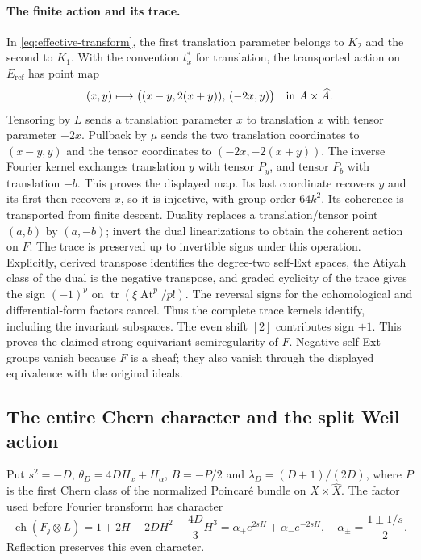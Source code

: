 \documentclass[11pt]{article}
\theoremstyle{definition}
\theoremstyle{remark}
\begin{document}
\paragraph{The finite action and its trace.}
In \eqref{eq:effective-transform}, the first translation parameter belongs to $K_2$ and
the second to $K_1$. With the convention $t_x^*$ for translation,
the transported action on $E_{\mathrm{ref}}$ has point map
\begin{equation}\label{eq:effective-action}
 (x,y)\longmapsto
 \bigl((x-y,2(x+y)),\,(-2x,y)\bigr)
 \quad\hbox{in }A\times\widehat A.                       
\end{equation}
Tensoring by $L$ sends a translation parameter $x$ to translation $x$ with tensor parameter $-2x$. Pullback by $\mu$ sends the two translation coordinates to $(x-y,y)$ and the tensor coordinates to $(-2x,-2(x+y))$. The inverse Fourier kernel exchanges translation $y$ with tensor $P_y$, and tensor $P_b$ with translation $-b$. This proves the displayed map. Its last coordinate recovers $y$ and its first then recovers $x$, so it is injective, with group order $64k^2$. Its coherence is transported from finite descent. Duality replaces a translation/tensor
point $(a,b)$ by $(a,-b)$; invert the dual linearizations to obtain
the coherent action on $F$. The trace is preserved up to invertible
signs under this operation. Explicitly, derived transpose identifies
the degree-two self-Ext spaces, the Atiyah class of the dual is
the negative transpose, and graded cyclicity of the trace gives
the sign $(-1)^p$ on
$\operatorname{tr}(\xi\operatorname{At}^p/p!)$.
The reversal signs for the cohomological and differential-form
factors cancel. Thus the complete trace kernels identify, including
the invariant subspaces. The even shift $[2]$ contributes sign $+1$.
This proves the claimed strong equivariant semiregularity of $F$.
Negative self-Ext groups vanish because $F$ is a sheaf; they also
vanish through the displayed equivalence with the original ideals.

\subsection{The entire Chern character and the split Weil action}
Put $s^2=-D$, $\theta_D=4DH_x+H_\alpha$, $B=-P/2$ and $\lambda_D=(D+1)/(2D)$, where $P$ is the first Chern class of the normalized Poincar\'e bundle on $X\times\widehat X$. The factor used before Fourier transform has character
\[
 \operatorname{ch}(F_j\otimes L)=1+2H-2DH^2-\frac{4D}{3}H^3
     =\alpha_+e^{2sH}+\alpha_-e^{-2sH},
 \quad\alpha_\pm=\frac{1\pm1/s}{2}.
\]
Reflection preserves this even character.
\end{document}
